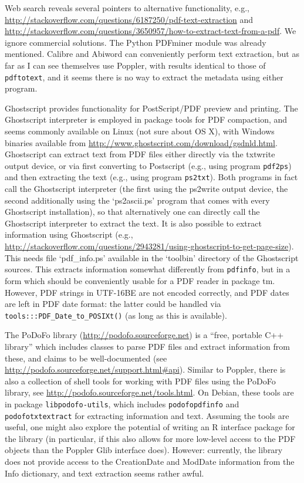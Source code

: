 \documentclass[a4paper]{article}
\newcommand{\file}[1]{`\textsf{#1}'}
\newcommand{\strong}[1]{{\normalfont\fontseries{b}\selectfont #1}}
\let\pkg=\strong
\begin{document}
Web search reveals several pointers to alternative functionality, e.g.,
\url{http://stackoverflow.com/questions/6187250/pdf-text-extraction} and 
\url{http://stackoverflow.com/questions/3650957/how-to-extract-text-from-a-pdf}.
We ignore commercial solutions.  The Python PDFminer module was already
mentioned.  Calibre and Abiword can conveniently perform text
extraction, but as far as I can see themselves use Poppler, with results
identical to those of \verb|pdftotext|, and it seems there is no way to
extract the metadata using either program.

Ghostscript provides functionality for PostScript/PDF preview and
printing.  The Ghostscript interpreter is employed in package
\pkg{tools} for PDF compaction, and seems commonly available on Linux
(not sure about OS X), with Windows binaries available from
\url{http://www.ghostscript.com/download/gsdnld.html}.  Ghostscript can
extract text from PDF files either directly via the txtwrite output
device, or via first converting to Postscript (e.g., using program
\verb|pdf2ps|) and then extracting the text (e.g., using program
\verb|ps2txt|).  Both programs in fact call the Ghostscript interpreter
(the first using the ps2write output device, the second additionally
using the \file{ps2ascii.ps} program that comes with every Ghostscript
installation), so that alternatively one can directly call the
Ghostscript interpreter to extract the text.  It is also possible to
extract information using Ghostscript (e.g.,
\url{http://stackoverflow.com/questions/2943281/using-ghostscript-to-get-page-size}).
This needs file \file{pdf\_info.ps} available in the \file{toolbin}
directory of the Ghostscript sources.  This extracts information
somewhat differently from \verb|pdfinfo|, but in a form which should be
conveniently usable for a PDF reader in package \pkg{tm}.  However, PDF
strings in UTF-16BE are not encoded correctly, and PDF dates are left in
PDF date format: the latter could be handled via
\verb|tools:::PDF_Date_to_POSIXt()| (as long as this is available).

The PoDoFo library (\url{http://podofo.sourceforge.net}) is a ``free,
portable C++ library'' which includes classes to parse PDF files and
extract information from these, and claims to be well-documented (see
\url{http://podofo.sourceforge.net/support.html#api}).  Similar to
Poppler, there is also a collection of shell tools for working with PDF
files using the PoDoFo library, see
\url{http://podofo.sourceforge.net/tools.html}.  On Debian, these tools
are in package \verb|libpodofo-utils|, which includes
\verb|podofopdfinfo| and \verb|podofotxtextract| for extracting
information and text.  Assuming the tools are useful, one might also
explore the potential of writing an R interface package for the library
(in particular, if this also allows for more low-level access to the PDF
objects than the Poppler Glib interface does).  However: currently,
the library does not provide access to the CreationDate and ModDate
information from the Info dictionary, and text extraction seems rather
awful.
\end{document}
